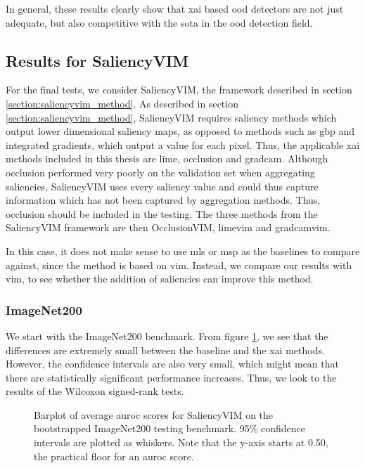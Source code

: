 \documentclass[UKenglish]{uiomasterthesis} %
\theoremstyle{definition}
\begin{document}
In general, these results clearly show that \ac{xai} based \ac{ood} detectors are not just adequate, but also competitive with the \ac{sota} in the \ac{ood} detection field.

\subsection{Results for SaliencyVIM}

For the final tests, we consider SaliencyVIM, the framework described in section \ref{section:saliencyvim_method}. As described in section \ref{section:saliencyvim_method}, SaliencyVIM requires saliency methods which output lower dimensional saliency maps, as opposed to methods such as \ac{gbp} and integrated gradients, which output a value for each pixel. Thus, the applicable \ac{xai} methods included in this thesis are \ac{lime}, occlusion and \ac{gradcam}. Although occlusion performed very poorly on the validation set when aggregating saliencies, SaliencyVIM uses every saliency value and could thus capture information which has not been captured by aggregation methods. Thus, occlusion should be included in the testing. The three methods from the SaliencyVIM framework are then OcclusionVIM, \ac{lime}\ac{vim} and \ac{gradcam}\ac{vim}. 

In this case, it does not make sense to use \ac{mls} or \ac{msp} as the baselines to compare against, since the method is based on \ac{vim}. Instead, we compare our results with \ac{vim}, to see whether the addition of saliencies can improve this method.

\subsubsection{ImageNet200}

We start with the ImageNet200 benchmark. From figure \ref{fig:imagenet200_salvim_bootstrap_barplot}, we see that the differences are extremely small between the baseline and the \ac{xai} methods. However, the confidence intervals are also very small, which might mean that there are statistically significant performance increases. Thus, we look to the results of the Wilcoxon signed-rank tests.

\begin{figure}[hbtp]
    \begin{center}
        
    \end{center}
    \caption[ImageNet200 SaliencyVIM Bootstrap]{Barplot of average \ac{auroc} scores for SaliencyVIM on the bootstrapped ImageNet200 testing benchmark. 95\% confidence intervals are plotted as whiskers. Note that the y-axis starts at 0.50, the practical floor for an \ac{auroc} score.}
    \label{fig:imagenet200_salvim_bootstrap_barplot}
\end{figure}
\end{document}
